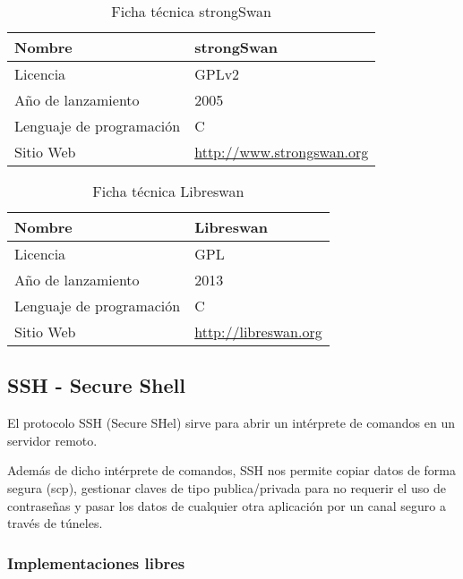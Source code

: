 \begin{table}[H]
\begin{tabular}{|l|l|}
\hline
Nombre                   & strongSwan                       \\ \hline
Licencia                 & GPLv2                            \\ \hline
Año de lanzamiento       & 2005                           \\ \hline
Lenguaje de programación & C                              \\ \hline
Sitio Web                & \url{http://www.strongswan.org} \\ \hline
\end{tabular}
\caption{Ficha técnica strongSwan}
\end{table}

\begin{table}[H]
\begin{tabular}{|l|l|}
\hline
Nombre                   & Libreswan                       \\ \hline
Licencia                 & GPL                            \\ \hline
Año de lanzamiento       & 2013                           \\ \hline
Lenguaje de programación & C                              \\ \hline
Sitio Web                & \url{http://libreswan.org} \\ \hline
\end{tabular}
\caption{Ficha técnica Libreswan}
\end{table}


\subsection {SSH - Secure Shell}

El protocolo SSH (Secure SHel) sirve para abrir un intérprete de comandos en un servidor remoto.

\bigskip
Además de dicho intérprete de comandos, SSH nos permite copiar datos de forma segura (scp), gestionar claves de tipo publica/privada para no requerir el uso de contraseñas y pasar los datos de cualquier otra aplicación por un canal seguro a través de túneles.

\subsubsection {Implementaciones libres}

